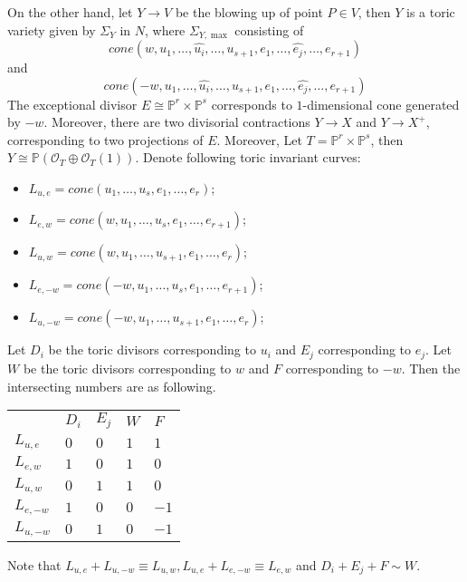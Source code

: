 \documentclass{article}
\begin{document}
On the other hand, let $Y\to V$ be the blowing up of point $P \in V$, then $Y$ is a toric variety given by $\Sigma_{Y}$ in $N$, where $\Sigma_{Y,\max}$ consisting of
\[
  cone(w,u_{1},\ldots ,\hat{u_{i}},\ldots ,u_{s+1},e_{1},\ldots ,\hat{e_{j}},\ldots ,e_{r+1})
\]
and
\[
  cone(-w,u_{1},\ldots ,\hat{u_{i}},\ldots ,u_{s+1},e_{1},\ldots ,\hat{e_{j}},\ldots ,e_{r+1})
\]
The exceptional divisor $E\cong \mathbb{P}^{r} \times \mathbb{P}^{s}$ corresponds to $1$-dimensional cone generated by $-w$. Moreover, there are two divisorial contractions $Y\to X$ and $Y\to X^{+}$, corresponding to two projections of $E$.
Moreover, Let $T=\mathbb{P}^{r} \times \mathbb{P}^{s}$, then $Y\cong \mathbb{P}(\mathcal{O}_{T}\oplus\mathcal{O}_{T}(1))$.
Denote following toric invariant curves:
\begin{itemize}
  \item $L_{u,e}=cone(u_{1},\ldots ,u_{s},e_{1},\ldots ,e_{r})$;
  \item $L_{e,w}=cone(w,u_{1},\ldots ,u_{s},e_{1},\ldots ,e_{r+1})$;
  \item $L_{u,w}=cone(w,u_{1},\ldots ,u_{s+1},e_{1},\ldots ,e_{r})$;
  \item $L_{e,-w}=cone(-w,u_{1},\ldots ,u_{s},e_{1},\ldots ,e_{r+1})$;
  \item $L_{u,-w}=cone(-w,u_{1},\ldots ,u_{s+1},e_{1},\ldots ,e_{r})$;
\end{itemize}
Let $D_{i}$ be the toric divisors corresponding to $u_{i}$ and $E_{j}$ corresponding to $e_{j}$. Let $W$ be the toric divisors corresponding to $w$ and $F$ corresponding to $-w$.  Then the intersecting numbers are as following. 

\begin{table}[]
\begin{tabular}{lllll}
           & $D_{i}$ & $E_{j}$  & $W$ & $F$       \\
 $L_{u,e}$ & $0$     & $0$      & $1$ & $1$  \\
 $L_{e,w}$ & $1$     & $0$      & $1$ & $0$  \\
 $L_{u,w}$ & $0$     & $1$      & $1$ & $0$  \\
 $L_{e,-w}$ & $1$     & $0$      & $0$ & $-1$  \\
 $L_{u,-w}$ & $0$     & $1$      & $0$ & $-1$  \\
\end{tabular}
\end{table}

Note that $L_{u,e}+L_{u,-w}\equiv L_{u,w},L_{u,e}+L_{e,-w}\equiv L_{e,w}$ and $D_{i}+E_{j}+F\sim W$.
\end{document}
